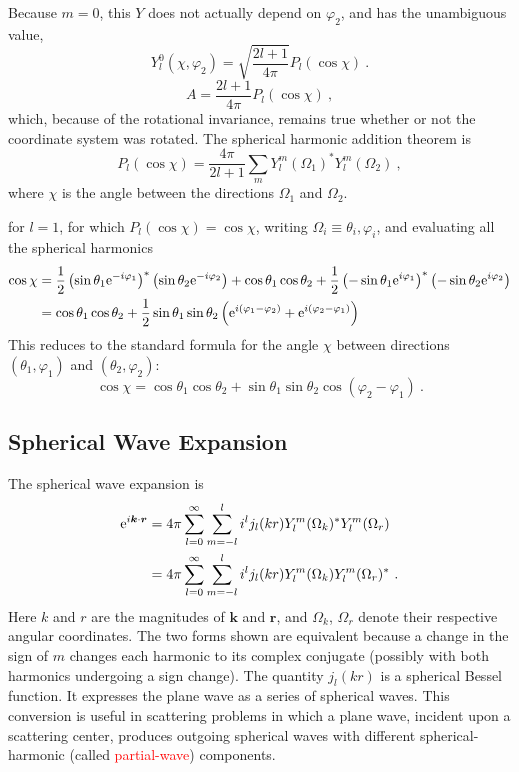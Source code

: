 \documentclass[12pt,a4paper]{article}
\renewcommand{\vec}[1]{\boldsymbol{#1}}
\begin{document}
Because $m = 0$, this $Y$ does not actually depend on $\varphi_2$, and has the unambiguous value,
\begin{equation}
Y_l^0(\chi, \varphi_2) = \sqrt{\dfrac{2l+1}{4\pi} } P_l(\cos \chi)  ~.
\end{equation}
\begin{equation}
A = \dfrac{2l+1}{4\pi} P_l(\cos \chi) ~,
\end{equation}
which, because of the rotational invariance, remains true whether or not the coordinate system was rotated. The spherical harmonic addition theorem is
\begin{equation}
P_l(\cos \chi) = \dfrac{4\pi}{2l+1} \sum_m Y_l^m(\Omega_1)^\ast Y_l^m(\Omega_2) ~,
\end{equation}
where $\chi$ is the angle between the directions $\Omega_1$ and $\Omega_2$.

for $l = 1$, for which $P_l(\cos \chi) = \cos \chi$, writing $\Omega_i \equiv \theta_i, \varphi_i$, and evaluating all the spherical harmonics
\begin{align}
\nonumber \cos \chi &= \dfrac{1}{2} \left(\sin \theta_1 {\rm e}^{-i\varphi_1} \right)^\ast \left(\sin \theta_2 {\rm e}^{-i\varphi_2} \right) +\cos \theta_1 \cos \theta_2 +\dfrac{1}{2} \left(-\sin \theta_1 {\rm e}^{i\varphi_1} \right)^\ast \left(-\sin \theta_2 {\rm e}^{i\varphi_2} \right) \\
\nonumber &= \cos \theta_1 \cos \theta_2 +\dfrac{1}{2} \sin \theta_1 \sin \theta_2 \left({\rm e}^{i(\varphi_1-\varphi_2)}+{\rm e}^{i(\varphi_2-\varphi_1)} \right)
\end{align}
This reduces to the standard formula for the angle $\chi$ between directions $(\theta_1, \varphi_1)$ and $(\theta_2, \varphi_2)$:
\begin{equation}
\cos \chi = \cos \theta_1 \cos \theta_2 +\sin \theta_1 \sin \theta_2 \cos(\varphi_2 -\varphi_1) ~.
\end{equation}

\subsection{Spherical Wave Expansion}
The spherical wave expansion is
\begin{align}
{\rm e}^{i\vec{k}\cdot \vec{r}} &= 4\pi \sum_{l=0}^\infty \sum_{m=-l}^{l} i^l j_l(kr) Y_l^m(\Omega_k)^\ast Y_l^m(\Omega_r) \\
&= 4\pi \sum_{l=0}^\infty \sum_{m=-l}^{l} i^l j_l(kr) Y_l^m(\Omega_k) Y_l^m(\Omega_r)^\ast ~.
\end{align}
Here $k$ and $r$ are the magnitudes of $\vec{k}$ and $\vec{r}$, and $\Omega_k$, $\Omega_r$ denote their respective angular coordinates. The two forms shown are equivalent because a change in the sign of $m$ changes each harmonic to its complex conjugate (possibly with both harmonics undergoing a sign change). The quantity $j_l(kr)$ is a spherical Bessel function. It expresses the plane wave as a series of spherical waves. This conversion is useful in scattering problems in which a plane wave, incident upon a scattering center, produces outgoing spherical waves with different spherical-harmonic (called \textcolor{red}{partial-wave}) components.
\end{document}

